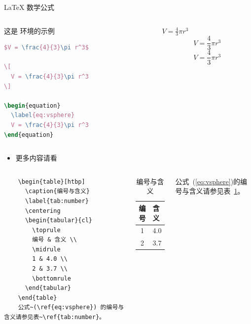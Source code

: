 \documentclass{beamer}
\begin{document}
\begin{frame}[fragile]{\LaTeX{} 数学公式}
    \begin{columns}
        \begin{column}{.55\textwidth}
            这是  环境的示例
\begin{lstlisting}[language=TeX]
$V = \frac{4}{3}\pi r^3$

\[
  V = \frac{4}{3}\pi r^3
\]

\begin{equation}
  \label{eq:vsphere}
  V = \frac{4}{3}\pi r^3
\end{equation}
\end{lstlisting}
        \end{column}
        \begin{column}{.4\textwidth}
            $V = \frac{4}{3}\pi r^3$
            \[
                V = \frac{4}{3}\pi r^3
            \]
            \begin{equation}
                \label{eq:vsphere}
                V = \frac{4}{3}\pi r^3
            \end{equation}
        \end{column}
    \end{columns}
    \begin{itemize}
        \item 更多内容请看\cite{Lin1992} \href{https://zh.wikipedia.org/wiki/Help:数学公式}{\color{purple}{这里}}
    \end{itemize}
\end{frame}

\begin{frame}[fragile]
    \begin{columns}
\begin{verbatim}
    \begin{table}[htbp]
      \caption{编号与含义}
      \label{tab:number}
      \centering
      \begin{tabular}{cl}
        \toprule
        编号 & 含义 \\
        \midrule
        1 & 4.0 \\
        2 & 3.7 \\
        \bottomrule
      \end{tabular}
    \end{table}
    公式~(\ref{eq:vsphere}) 的编号与含义请参见表~\ref{tab:number}。
\end{verbatim}
        \begin{table}[htpb]
            \centering
            \caption{编号与含义}
            \label{tab:number}
            \begin{tabular}{cl}\toprule
                编号 & 含义 \\\midrule
                1 & 4.0\\
                2 & 3.7\\\bottomrule
            \end{tabular}
        \end{table}
        \normalsize 公式~(\ref{eq:vsphere})的编号与含义请参见表~\ref{tab:number}。
    \end{columns}
\end{frame}
\end{document}
